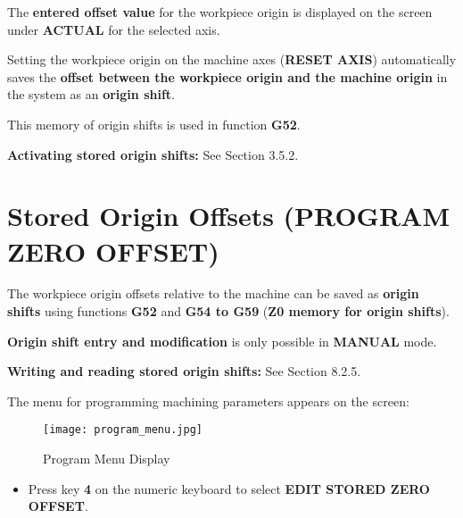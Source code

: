 The \textbf{entered offset value} for the workpiece origin is displayed on the screen under \textbf{ACTUAL} for the selected axis.

\begin{itemize}
\end{itemize}
\vspace{.5cm}
\notes

Setting the workpiece origin on the machine axes (\textbf{RESET AXIS}) automatically saves the \textbf{offset between the workpiece origin and the machine origin} in the system as an \textbf{origin shift}.

This memory of origin shifts is used in function \textbf{G52}.

\textbf{Activating stored origin shifts:} See Section 3.5.2.

\newpage
\section{Stored Origin Offsets (PROGRAM ZERO OFFSET)}

The workpiece origin offsets relative to the machine can be saved as \textbf{origin shifts} using functions \textbf{G52} and \textbf{G54 to G59} (\textbf{Z0 memory for origin shifts}).

\textbf{Origin shift entry and modification} is only possible in \textbf{MANUAL} mode.

\textbf{Writing and reading stored origin shifts:} See Section 8.2.5.

\procedure

\begin{itemize}
    \vspace{.6cm}
    \vspace{.6cm}
\end{itemize}
\vspace{.5cm}
The menu for programming machining parameters appears on the screen:

\begin{figure}[h]
    \centering
    \texttt{[image: program\_menu.jpg]}
    \caption{Program Menu Display}
\end{figure}

\begin{itemize}
    \item Press key \textbf{4} on the numeric keyboard to select \textbf{EDIT STORED ZERO OFFSET}.
\end{itemize}

